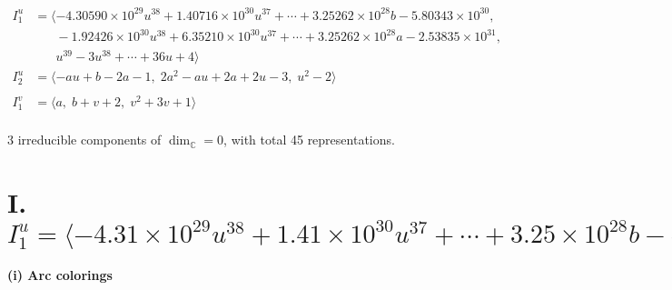 \documentclass[1p]{elsarticle_modified}
\theoremstyle{definition}
\begin{document}
\begin{align*}
I^u_{1}&=\langle 
-4.30590\times10^{29} u^{38}+1.40716\times10^{30} u^{37}+\cdots+3.25262\times10^{28} b-5.80343\times10^{30},\\
\phantom{I^u_{1}}&\phantom{= \langle  }-1.92426\times10^{30} u^{38}+6.35210\times10^{30} u^{37}+\cdots+3.25262\times10^{28} a-2.53835\times10^{31},\\
\phantom{I^u_{1}}&\phantom{= \langle  }u^{39}-3 u^{38}+\cdots+36 u+4\rangle \\
I^u_{2}&=\langle 
- a u+b-2 a-1,\;2 a^2- a u+2 a+2 u-3,\;u^2-2\rangle \\
\\
I^v_{1}&=\langle 
a,\;b+v+2,\;v^2+3 v+1\rangle \\
\end{align*}
\raggedright * 3 irreducible components of $\dim_{\mathbb{C}}=0$, with total 45 representations.\\
\newpage
\renewcommand{\arraystretch}{1}
\centering \section*{I. $I^u_{1}= \langle -4.31\times10^{29} u^{38}+1.41\times10^{30} u^{37}+\cdots+3.25\times10^{28} b-5.80\times10^{30},\;-1.92\times10^{30} u^{38}+6.35\times10^{30} u^{37}+\cdots+3.25\times10^{28} a-2.54\times10^{31},\;u^{39}-3 u^{38}+\cdots+36 u+4 \rangle$}
\flushleft \textbf{(i) Arc colorings}\\
\end{document}
